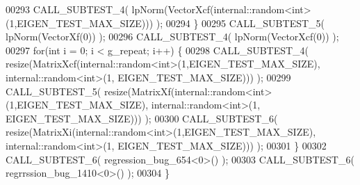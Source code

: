 \begin{DoxyCode}
00293     CALL\_SUBTEST\_4( lpNorm(VectorXcf(internal::random<int>(1,EIGEN\_TEST\_MAX\_SIZE))) );
00294   \}
00295   CALL\_SUBTEST\_5( lpNorm(VectorXf(0)) );
00296   CALL\_SUBTEST\_4( lpNorm(VectorXcf(0)) );
00297   \textcolor{keywordflow}{for}(\textcolor{keywordtype}{int} i = 0; i < g\_repeat; i++) \{
00298     CALL\_SUBTEST\_4( resize(MatrixXcf(internal::random<int>(1,EIGEN\_TEST\_MAX\_SIZE), internal::random<int>(1,
      EIGEN\_TEST\_MAX\_SIZE))) );
00299     CALL\_SUBTEST\_5( resize(MatrixXf(internal::random<int>(1,EIGEN\_TEST\_MAX\_SIZE), internal::random<int>(1,
      EIGEN\_TEST\_MAX\_SIZE))) );
00300     CALL\_SUBTEST\_6( resize(MatrixXi(internal::random<int>(1,EIGEN\_TEST\_MAX\_SIZE), internal::random<int>(1,
      EIGEN\_TEST\_MAX\_SIZE))) );
00301   \}
00302   CALL\_SUBTEST\_6( regression\_bug\_654<0>() );
00303   CALL\_SUBTEST\_6( regrrssion\_bug\_1410<0>() );
00304 \}
\end{DoxyCode}
